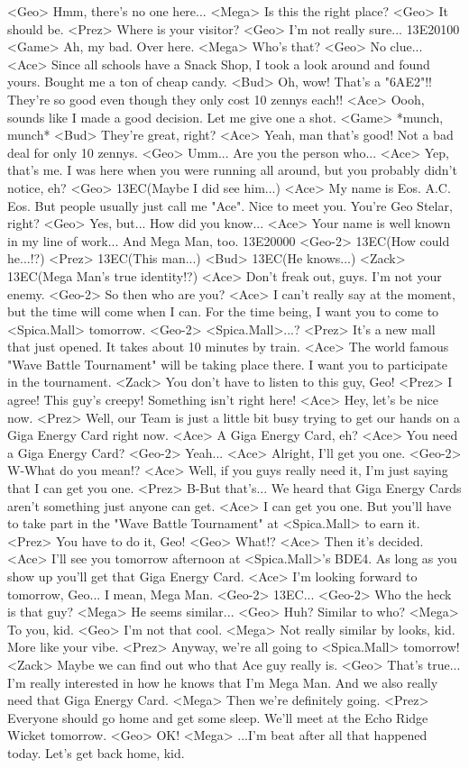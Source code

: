 <Geo> Hmm, there's no one here... 
<Mega> Is this the right place? 
<Geo> It should be. 
<Prez> Where is your visitor? 
<Geo> I'm not really sure... 
{13}{E2}{01}{00} 
<Game> Ah, my bad. Over here. 
<Mega> Who's that? 
<Geo> No clue... 
<Ace> Since all schools have a Snack Shop, I took a look around and found yours. 
Bought me a ton of cheap candy. 
<Bud> Oh, wow! That's a "{6A}{E2}"!! 
They're so good even though they only cost 10 zennys each!! 
<Ace> Oooh, sounds like I made a good decision. 
Let me give one a shot. 
<Game> *munch, munch* 
<Bud> They're great, right? 
<Ace> Yeah, man that's good! Not a bad deal for only 10 zennys. 
<Geo> Umm... Are you the person who... 
<Ace> Yep, that's me. 
I was here when you were running all around, but you probably didn't notice, eh? 
<Geo> {13}{EC}(Maybe I did see him...) 
<Ace> My name is Eos. A.C. Eos. But people usually just call me "Ace". 
Nice to meet you. You're Geo Stelar, right? 
<Geo> Yes, but... 
How did you know... 
<Ace> Your name is well known in my line of work... 
And Mega Man, too. 
{13}{E2}{00}{00}
<Geo-2> {13}{EC}(How could he...!?) 
<Prez> {13}{EC}(This man...) 
<Bud> {13}{EC}(He knows...) 
<Zack> {13}{EC}(Mega Man's true identity!?) 
<Ace> Don't freak out, guys. I'm not your enemy. 
<Geo-2> So then who are you? 
<Ace> I can't really say at the moment, but the time will come when I can. 
For the time being, I want you to come to <Spica.Mall> tomorrow. 
<Geo-2> <Spica.Mall>...? 
<Prez> It's a new mall that just opened. It takes about 10 minutes by train. 
<Ace> The world famous "Wave Battle Tournament" will be taking place there. 
I want you to participate in the tournament. 
<Zack> You don't have to listen to this guy, Geo! 
<Prez> I agree! This guy's creepy! Something isn't right here! 
<Ace> Hey, let's be nice now. 
<Prez> Well, our Team is just a little bit busy trying to 
get our hands on a Giga Energy Card right now. 
<Ace> A Giga Energy Card, eh? 
<Ace> You need a Giga Energy Card? 
<Geo-2> Yeah... 
<Ace> Alright, I'll get you one. 
<Geo-2> W-What do you mean!? 
<Ace> Well, if you guys really need it, I'm just saying that I can get you one. 
<Prez> B-But that's... 
We heard that Giga Energy Cards aren't something just anyone can get. 
<Ace> I can get you one. 
But you'll have to take part in the 
"Wave Battle Tournament" at <Spica.Mall> to earn it. 
<Prez> You have to do it, Geo! 
<Geo> What!? 
<Ace> Then it's decided. 
<Ace> I'll see you tomorrow afternoon at <Spica.Mall>'s {BD}{E4}. 
As long as you show up you'll get that Giga Energy Card. 
<Ace> I'm looking forward to tomorrow, Geo... 
I mean, Mega Man. 
<Geo-2> {13}{EC}... 
<Geo-2> Who the heck is that guy? 
<Mega> He seems similar... 
<Geo> Huh? Similar to who? 
<Mega> To you, kid. 
<Geo> I'm not that cool. 
<Mega> Not really similar by looks, kid. More like your vibe. 
<Prez> Anyway, we're all going to <Spica.Mall> tomorrow! 
<Zack> Maybe we can find out who that Ace guy really is. 
<Geo> That's true... 
I'm really interested in how he knows that I'm Mega Man. 
And we also really need that Giga Energy Card. 
<Mega> Then we're definitely going. 
<Prez> Everyone should go home and get some sleep. 
We'll meet at the Echo Ridge Wicket tomorrow. 
<Geo> OK! 
<Mega> ...I'm beat after all that happened today. 
Let's get back home, kid. 
